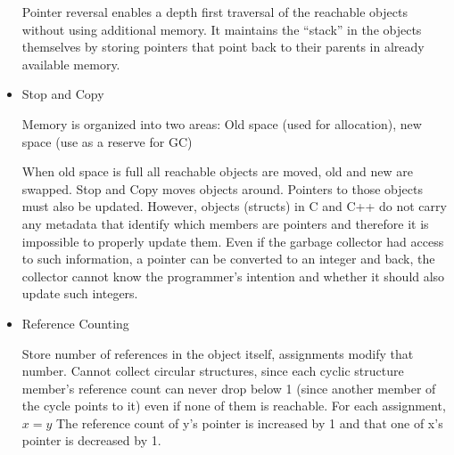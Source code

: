 \documentclass[10pt,landscape]{article}
\begin{document}
\begin{multicols}{3}
\begin{itemize}
	Pointer reversal enables a depth first traversal of the reachable objects without using additional memory. It maintains the “stack” in the objects themselves by storing pointers that
  point back to their parents in already available memory. 
	\item Stop and Copy
	
	Memory is organized into two areas: Old space (used for allocation), new space (use as a reserve for GC)
	
	When old space is full all reachable objects are moved, old and new are swapped.
  Stop and Copy moves objects around. Pointers to those objects must also be updated.
However, objects (structs) in C and C++ do not carry any metadata that identify which
members are pointers and therefore it is impossible to properly update them. Even if the
garbage collector had access to such information, a pointer can be converted to an integer
and back, the collector cannot know the programmer's intention and whether it should also
update such integers.
	\item Reference Counting
	
	Store number of references in the object itself, assignments modify that number. Cannot collect circular structures, since each cyclic structure member’s reference count can never drop below 1 (since another
  member of the cycle points to it) even if none of them is reachable.
	For each assignment, $x = y$ The reference count of y's pointer is increased by 1 and that one of x's pointer is decreased by 1.

\end{itemize}
\newpage
\end{multicols}
\end{document}
